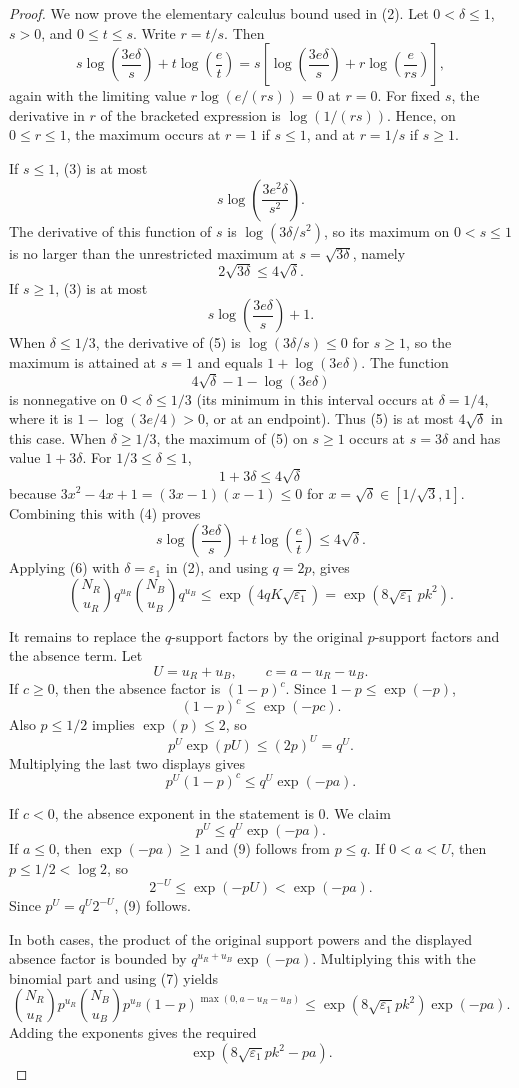 \begin{proof}
We now prove the elementary calculus bound used in (2).  Let
\(0<\delta\le1\), \(s>0\), and \(0\le t\le s\).  Write \(r=t/s\).  Then
\[
s\log\!\left(\frac{3e\delta}{s}\right)
+t\log\!\left(\frac e t\right)
=
s\left[
\log\!\left(\frac{3e\delta}{s}\right)
+r\log\!\left(\frac e{rs}\right)\right],        \tag{3}
\]
again with the limiting value \(r\log(e/(rs))=0\) at \(r=0\).  For fixed
\(s\), the derivative in \(r\) of the bracketed expression is
\(\log(1/(rs))\).  Hence, on \(0\le r\le1\), the maximum occurs at
\(r=1\) if \(s\le1\), and at \(r=1/s\) if \(s\ge1\).

If \(s\le1\), (3) is at most
\[
s\log\!\left(\frac{3e^2\delta}{s^2}\right).
\]
The derivative of this function of \(s\) is
\(\log(3\delta/s^2)\), so its maximum on \(0<s\le1\) is no larger than the
unrestricted maximum at \(s=\sqrt{3\delta}\), namely
\[
2\sqrt{3\delta}\le4\sqrt\delta. \tag{4}
\]
If \(s\ge1\), (3) is at most
\[
s\log\!\left(\frac{3e\delta}{s}\right)+1. \tag{5}
\]
When \(\delta\le1/3\), the derivative of (5) is
\(\log(3\delta/s)\le0\) for \(s\ge1\), so the maximum is attained at
\(s=1\) and equals \(1+\log(3e\delta)\).  The function
\[
4\sqrt\delta-1-\log(3e\delta)
\]
is nonnegative on \(0<\delta\le1/3\) (its minimum in this interval occurs at
\(\delta=1/4\), where it is \(1-\log(3e/4)>0\), or at an endpoint).  Thus
(5) is at most \(4\sqrt\delta\) in this case.  When
\(\delta\ge1/3\), the maximum of (5) on \(s\ge1\) occurs at \(s=3\delta\) and
has value \(1+3\delta\).  For \(1/3\le\delta\le1\),
\[
1+3\delta\le4\sqrt\delta
\]
because \(3x^2-4x+1=(3x-1)(x-1)\le0\) for
\(x=\sqrt\delta\in[1/\sqrt3,1]\).  Combining this with (4) proves
\[
s\log\!\left(\frac{3e\delta}{s}\right)
+t\log\!\left(\frac e t\right)
\le4\sqrt\delta. \tag{6}
\]
Applying (6) with \(\delta=\varepsilon_1\) in (2), and using \(q=2p\), gives
\[
\binom{N_R}{u_R}q^{u_R}
\binom{N_B}{u_B}q^{u_B}
\le
\exp(4qK\sqrt{\varepsilon_1})
=
\exp(8\sqrt{\varepsilon_1}\,p k^2). \tag{7}
\]

It remains to replace the \(q\)-support factors by the original \(p\)-support
factors and the absence term.  Let
\[
U=u_R+u_B,\qquad c=a-u_R-u_B.
\]
If \(c\ge0\), then the absence factor is \((1-p)^c\).  Since
\(1-p\le\exp(-p)\),
\[
(1-p)^c\le\exp(-pc).
\]
Also \(p\le1/2\) implies \(\exp(p)\le2\), so
\[
p^U\exp(pU)\le(2p)^U=q^U.
\]
Multiplying the last two displays gives
\[
p^U(1-p)^c\le q^U\exp(-pa). \tag{8}
\]

If \(c<0\), the absence exponent in the statement is \(0\).  We claim
\[
p^U\le q^U\exp(-pa). \tag{9}
\]
If \(a\le0\), then \(\exp(-pa)\ge1\) and (9) follows from \(p\le q\).  If
\(0<a<U\), then \(p\le1/2<\log2\), so
\[
2^{-U}\le\exp(-pU)<\exp(-pa).
\]
Since \(p^U=q^U2^{-U}\), (9) follows.

In both cases, the product of the original support powers and the displayed
absence factor is bounded by \(q^{u_R+u_B}\exp(-pa)\).  Multiplying this with
the binomial part and using (7) yields
\[
\binom{N_R}{u_R}p^{u_R}
\binom{N_B}{u_B}p^{u_B}
(1-p)^{\max(0,a-u_R-u_B)}
\le
\exp(8\sqrt{\varepsilon_1}pk^2)\exp(-pa).
\]
Adding the exponents gives the required
\[
\exp\!\left(8\sqrt{\varepsilon_1}pk^2-pa\right).
\]
\end{proof}
